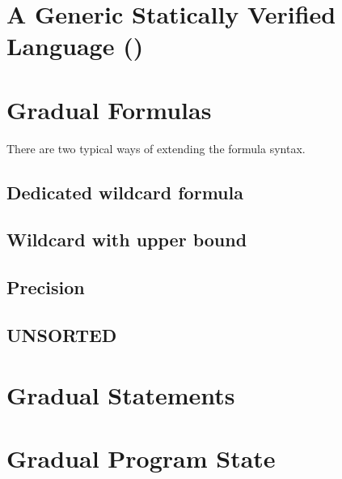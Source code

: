 \section{A Generic Statically Verified Language (\svl)}
\label{sec:a-statically-verified}


\section{Gradual Formulas}
\label{sec:gradual-formulas}


There are two typical ways of extending the formula syntax.
    \subsection{Dedicated wildcard formula}
    \label{ssec:dedicated-wildcard-formula}
    
    
    \subsection{Wildcard with upper bound}
    \label{ssec:wildcard-with-upper}
    

    \subsection{Precision}
    \label{ssec:precision}
    
    
    \subsection{UNSORTED}
    \label{ssec:gfconclusion}
    
    
    
\section{Gradual Statements}
\label{sec:gradual-statements}


\section{Gradual Program State}
\label{sec:gradual-program-state}


